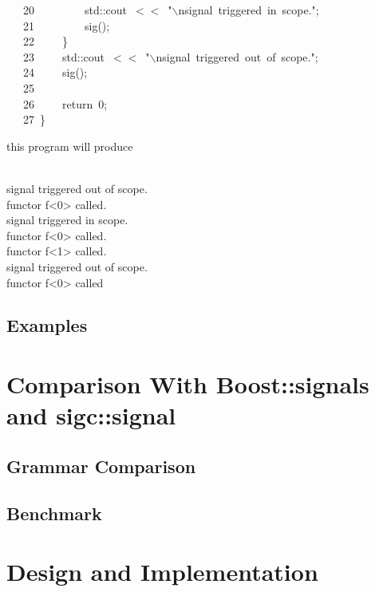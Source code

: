 \documentclass[9pt,onside,a4paper]{article}
\newcommand{\hlstd}[1]{\textcolor[rgb]{0.2,0,0.4}{#1}}
\newcommand{\hlnum}[1]{\textcolor[rgb]{0.2,0.73,0.02}{#1}}
\newcommand{\hlesc}[1]{\textcolor[rgb]{0.65,0.09,0.38}{#1}}
\newcommand{\hlstr}[1]{\textcolor[rgb]{0.09,0.38,0.65}{#1}}
\newcommand{\hlopt}[1]{\textcolor[rgb]{0.33,0.33,0.33}{#1}}
\newcommand{\hllin}[1]{\textcolor[rgb]{0.6,0.6,0.6}{#1}}
\newcommand{\hlkwa}[1]{\textcolor[rgb]{1,0.19,0.19}{#1}}
\newcommand{\hlkwd}[1]{\textcolor[rgb]{0.82,0.11,0.93}{#1}}
\begin{document}
\hllin{\ \ \ 20\ }\hlstd{}\hlstd{\ \ \ \ \ \ \ \ }\hlstd{std}\hlopt{::}\hlstd{cout\ }\hlopt{$<$$<$\ }\hlstd{}\hlstr{"}\hlesc{$\backslash$n}\hlstr{signal\ triggered\ in\ scope."}\hlstd{}\hlopt{;}\\
\hllin{\ \ \ 21\ }\hlstd{}\hlstd{\ \ \ \ \ \ \ \ }\hlstd{}\hlkwd{sig}\hlstd{}\hlopt{();}\\
\hllin{\ \ \ 22\ }\hlstd{}\hlstd{\ \ \ \ }\hlstd{}\hlopt{\}}\\
\hllin{\ \ \ 23\ }\hlstd{}\hlstd{\ \ \ \ }\hlstd{std}\hlopt{::}\hlstd{cout\ }\hlopt{$<$$<$\ }\hlstd{}\hlstr{"}\hlesc{$\backslash$n}\hlstr{signal\ triggered\ out\ of\ scope."}\hlstd{}\hlopt{;}\\
\hllin{\ \ \ 24\ }\hlstd{}\hlstd{\ \ \ \ }\hlstd{}\hlkwd{sig}\hlstd{}\hlopt{();}\\
\hllin{\ \ \ 25\ }\hlstd{\\
\hllin{\ \ \ 26\ }}\hlstd{\ \ \ \ }\hlstd{}\hlkwa{return\ }\hlstd{}\hlnum{0}\hlstd{}\hlopt{;}\\
\hllin{\ \ \ 27\ }\hlstd{}\hlopt{\}}\hlstd{}\\
\mbox{}
\normalfont
\normalsize

this program will produce 
\begin{shaded}
{\small
\ttfamily
~\\
signal triggered out of scope. \\
functor f<0> called. \\
signal triggered in scope. \\
functor f<0> called. \\
functor f<1> called. \\
signal triggered out of scope. \\
functor f<0> called 
\normalfont
}
\end{shaded}





\subsection{Examples}



\section{Comparison With Boost::signals and sigc::signal}
\subsection{Grammar Comparison}
\subsection{Benchmark}

\section{Design and Implementation}
\end{document}
